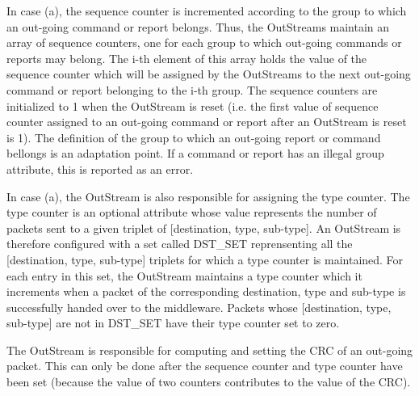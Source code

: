 In case (a), the sequence counter is incremented according to the group to which an out-going command or report belongs. Thus, the OutStreams maintain an array of sequence counters, one for each group to which out-going commands or reports may belong. The i-th element of this array holds the value of the sequence counter which will be assigned by the OutStreams to the next out-going command or report belonging to the i-th group. The sequence counters are initialized to 1 when the OutStream is reset (i.e. the first value of sequence counter assigned to an out-going command or report after an OutStream is reset is 1). The definition of the group to which an out-going report or command bellongs is an adaptation point. If a command or report has an illegal group attribute, this is reported as an error.

In case (a), the OutStream is also responsible for assigning the type counter. The type counter is an optional attribute whose value represents the number of packets sent to a given triplet of [destination, type, sub-type]. An OutStream is therefore configured with a set called DST\_SET reprensenting all the [destination, type, sub-type] triplets for which a type counter is maintained. For each entry in this set, the OutStream maintains a type counter which it increments when a packet of the corresponding destination, type and sub-type is successfully handed over to the middleware. Packets whose [destination, type, sub-type] are not in DST\_SET have their type counter set to zero.

The OutStream is responsible for computing and setting the CRC of an out-going packet. This can only be done after the sequence counter and type counter have been set (because the value of two counters contributes to the value of the CRC).
 
